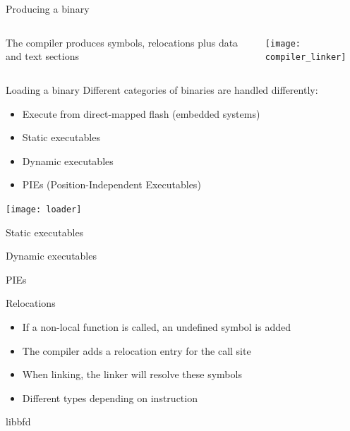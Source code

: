 \documentclass{beamer}
\begin{document}
\begin{frame}{Producing a binary}
  \begin{columns}
    \begin{column}{0.5\textwidth}
      The compiler produces symbols, relocations plus data and text sections
    \end{column}
    \begin{column}{0.5\textwidth}
      \texttt{[image: compiler\_linker]}
    \end{column}
  \end{columns}
\end{frame}

\begin{frame}{Loading a binary}
  Different categories of binaries are handled differently:
  \begin{itemize}
    \item Execute from direct-mapped flash (embedded systems)
    \item Static executables
    \item Dynamic executables
    \item PIEs (Position-Independent Executables)
  \end{itemize}

  \texttt{[image: loader]}
\end{frame}

\begin{frame}{Static executables}

\end{frame}

\begin{frame}{Dynamic executables}
\end{frame}

\begin{frame}{PIEs}
\end{frame}

\begin{frame}{Relocations}
  \begin{itemize}
    \item If a non-local function is called, an undefined symbol is added
    \item The compiler adds a relocation entry for the call site
    \item When linking, the linker will resolve these symbols
    \item Different types depending on instruction
  \end{itemize}

\end{frame}

\begin{frame}{libbfd}

  \end{frame}
\end{document}
